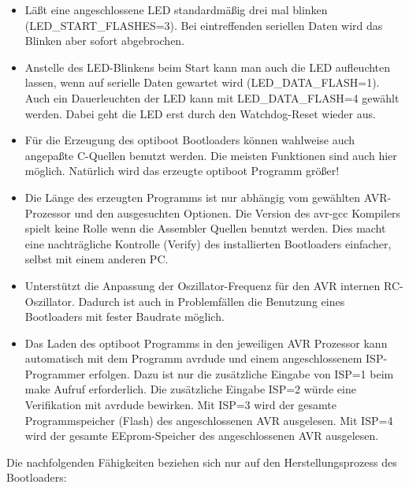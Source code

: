 \begin{itemize}
\item {Läßt eine angeschlossene LED standardmäßig drei mal blinken (LED\_START\_FLASHES=3).
	Bei eintreffenden seriellen Daten wird das Blinken aber sofort abgebrochen.}

\item {Anstelle des LED-Blinkens beim Start kann man auch die LED aufleuchten lassen, wenn 
	auf serielle Daten gewartet wird (LED\_DATA\_FLASH=1).
       Auch ein Dauerleuchten der LED kann mit LED\_DATA\_FLASH=4 gewählt werden.
       Dabei geht die LED erst durch den Watchdog-Reset wieder aus.}

\item {Für die Erzeugung des optiboot Bootloaders können wahlweise auch angepaßte C-Quellen
	benutzt werden. Die meisten Funktionen sind auch hier möglich.
	Natürlich wird das erzeugte optiboot Programm größer!}

\item {Die Länge des erzeugten Programms ist nur abhängig vom gewählten AVR-Prozessor
	und den ausgesuchten Optionen.
	Die Version des avr-gcc Kompilers spielt keine Rolle wenn die Assembler Quellen benutzt werden.
	Dies macht eine nachträgliche Kontrolle (Verify) des installierten Bootloaders
	einfacher, selbst mit einem anderen PC.}

\item {Unterstützt die Anpassung der Oszillator-Frequenz für den AVR internen RC-Oszillator.
 	Dadurch ist auch in Problemfällen die Benutzung eines Bootloaders mit fester Baudrate möglich.}

\item {Das Laden des optiboot Programms in den jeweiligen AVR Prozessor kann automatisch mit dem
	Programm avrdude und einem angeschlossenem ISP-Programmer erfolgen.
	Dazu ist nur die zusätzliche Eingabe von ISP=1 beim make Aufruf erforderlich.
	Die zusätzliche Eingabe ISP=2 würde eine Verifikation mit avrdude bewirken.
	Mit ISP=3 wird der gesamte Programmspeicher (Flash) des angeschlossenen AVR ausgelesen.
	Mit ISP=4 wird der gesamte EEprom-Speicher des angeschlossenen AVR ausgelesen.}

\end{itemize}

Die nachfolgenden Fähigkeiten beziehen sich nur auf den Herstellungsprozess des Bootloaders:

